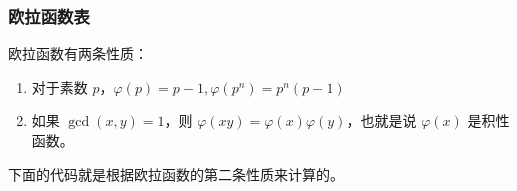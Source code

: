 \subsubsection{欧拉函数表}
	欧拉函数有两条性质：
	
	\begin{enumerate}
		\item 对于素数 $p$，$\varphi (p)=p-1,\varphi (p^{n})=p^{n}(p-1)$
		\item 如果 $\gcd(x,y)=1$，则 $\varphi (xy)=\varphi (x)\varphi (y)$，也就是说 $\varphi (x)$ 是积性函数。
	\end{enumerate}
	
	下面的代码就是根据欧拉函数的第二条性质来计算的。
	
	